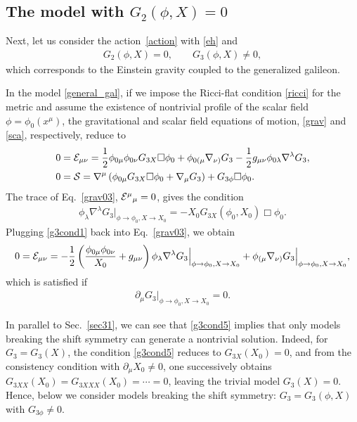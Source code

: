 \documentclass[prd,amsmath,amssymb,floatfix,superscriptaddress,notitlepage,nofootinbib,preprintnumbers]{revtex4-1}
\begin{document}
\subsection{The model with $G_2(\phi,X)=0$}
\label{sec32}


Next, let us consider the action~\eqref{action} with \eqref{eh} and
\begin{align}
\label{general_gal}
G_2(\phi,X)=0,
\qquad
G_3(\phi,X)\neq 0,
\end{align}
which corresponds to the Einstein gravity coupled to the generalized galileon.


In the model \eqref{general_gal},
if we impose the Ricci-flat condition \eqref{ricci} for the metric
and assume the existence of nontrivial profile of the scalar field $\phi=\phi_0(x^\mu)$,
the gravitational and scalar field equations of motion,
\eqref{grav} and \eqref{sca},
respectively,
reduce to 
\begin{align}
\label{grav03}
&0
={\cal E}_{\mu\nu}
=
 \frac{1}{2} \phi_{0\mu}\phi_{0\nu} G_{3X}\Box\phi_0 
 + \phi_{0(\mu} \nabla_{\nu)} G_3 
 -\frac{1}{2}g_{\mu\nu} \phi_{0\lambda} \nabla^\lambda G_3 , \\
\label{sca03}
&0={\cal S}
=
\nabla^\mu
\left(
 \phi_{0\mu} G_{3X}\Box\phi_0 
+\nabla_\mu G_3
\right)
+ G_{3\phi}\Box\phi_0.
\end{align}
The trace of Eq.~\eqref{grav03}, ${\cal E}^\mu{}_\mu=0$,
gives the condition
\begin{align}
\label{g3cond1}
\phi_\lambda \nabla^\lambda G_{3}  \Big|_{\phi\to \phi_0,X\to X_0}
=-X_0
 G_{3X} (\phi_0,X_0)\Box\phi_0.
\end{align}
Plugging \eqref{g3cond1} back into Eq.~\eqref{grav03}, we obtain
\begin{align}
0= {\cal E}_{\mu\nu}
=-\frac{1}{2}
  \left(
   \frac{\phi_{0\mu} \phi_{0\nu}}{X_0}
+ g_{\mu\nu}
  \right) 
\phi_\lambda \nabla^\lambda G_3 \Big|_{\phi\to \phi_0,X\to X_0}
+\phi_{(\mu}\nabla_{\nu)} G_3 
\Big|_{\phi\to \phi_0,X\to X_0},
\end{align}
which is satisfied if
\begin{align}
\label{g3cond5}
\partial_\mu G_{3} \Big|_{\phi\to \phi_0, X\to X_0}=0.
\end{align}


In parallel to Sec.~\ref{sec31}, we can see that \eqref{g3cond5} implies that 
only models breaking the shift symmetry can 
generate a nontrivial solution.  
Indeed, for $G_3=G_3(X)$, the condition \eqref{g3cond5} reduces to $G_{3X}(X_0)=0$, 
and from the consistency condition with $\partial_\mu X_0\neq 0$,
one successively obtains 
$G_{3XX}(X_0)=G_{3XXX}(X_0)=\cdots=0$,
leaving the trivial model $G_3(X)=0$.
Hence, below we consider models breaking the shift symmetry: $G_3=G_3(\phi, X)$ with $G_{3\phi}\neq 0$.
\end{document}
